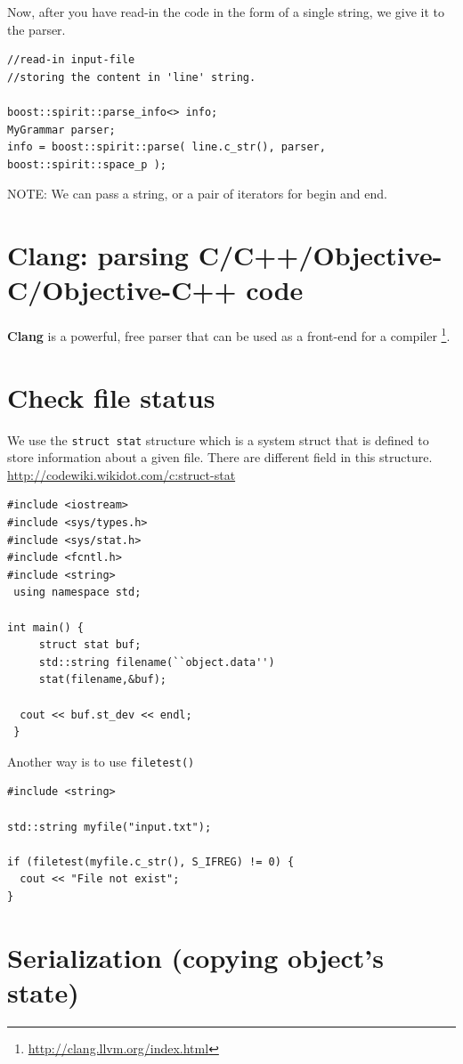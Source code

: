 Now, after you have read-in the code in the form of a single string, we give it
to the parser.
\begin{verbatim}
//read-in input-file
//storing the content in 'line' string.

boost::spirit::parse_info<> info;
MyGrammar parser;
info = boost::spirit::parse( line.c_str(), parser, boost::spirit::space_p );
\end{verbatim}
NOTE: We can pass a string, or a pair of iterators for begin and end.



\section{Clang: parsing C/C++/Objective-C/Objective-C++ code}

{\bf Clang} is a powerful, free parser that can be used as a front-end for a
compiler \footnote{\url{http://clang.llvm.org/index.html}}. 

\section{Check file status}

We use the \verb!struct stat! structure which is a system struct that is
defined to store information about a given file. There are different field in
this structure. \url{http://codewiki.wikidot.com/c:struct-stat}

 {\small 
\begin{verbatim}
#include <iostream>
#include <sys/types.h>
#include <sys/stat.h>
#include <fcntl.h>
#include <string>
 using namespace std;

int main() {
     struct stat buf;
     std::string filename(``object.data'')
     stat(filename,&buf);

  cout << buf.st_dev << endl;     
 }
\end{verbatim}
}

Another way is to use \verb!filetest()!
\begin{verbatim}
#include <string>

std::string myfile("input.txt");

if (filetest(myfile.c_str(), S_IFREG) != 0) {
  cout << "File not exist";
}
\end{verbatim}

\section{Serialization (copying object's state)}
\label{sec:Serialization_C_C++}

